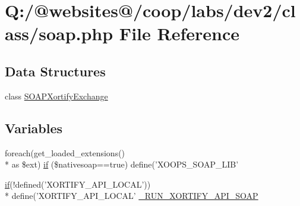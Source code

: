 \hypertarget{soap_8php}{\section{Q\-:/@websites@/coop/labs/dev2/class/soap.php File Reference}
\label{soap_8php}
}
\subsection*{Data Structures}
\begin{DoxyCompactItemize}
\item 
class \hyperlink{class_s_o_a_p_xortify_exchange}{S\-O\-A\-P\-Xortify\-Exchange}
\end{DoxyCompactItemize}
\subsection*{Variables}
\begin{DoxyCompactItemize}
\item 
foreach(get\-\_\-loaded\-\_\-extensions() \\*
as \$ext) \hyperlink{soap_8php_a6146df301f89432497e6bfe9680af293}{if} (\$nativesoap==true) define('X\-O\-O\-P\-S\-\_\-\-S\-O\-A\-P\-\_\-\-L\-I\-B'
\item 
\hyperlink{index_8php_ae2ccdf355624402b65fc2226f2a661cd}{if}(!defined('X\-O\-R\-T\-I\-F\-Y\-\_\-\-A\-P\-I\-\_\-\-L\-O\-C\-A\-L')) \\*
define('X\-O\-R\-T\-I\-F\-Y\-\_\-\-A\-P\-I\-\_\-\-L\-O\-C\-A\-L' \hyperlink{soap_8php_a07583d496751dd9a708941cbd134b611}{\-\_\-\-R\-U\-N\-\_\-\-X\-O\-R\-T\-I\-F\-Y\-\_\-\-A\-P\-I\-\_\-\-S\-O\-A\-P}
\end{DoxyCompactItemize}


